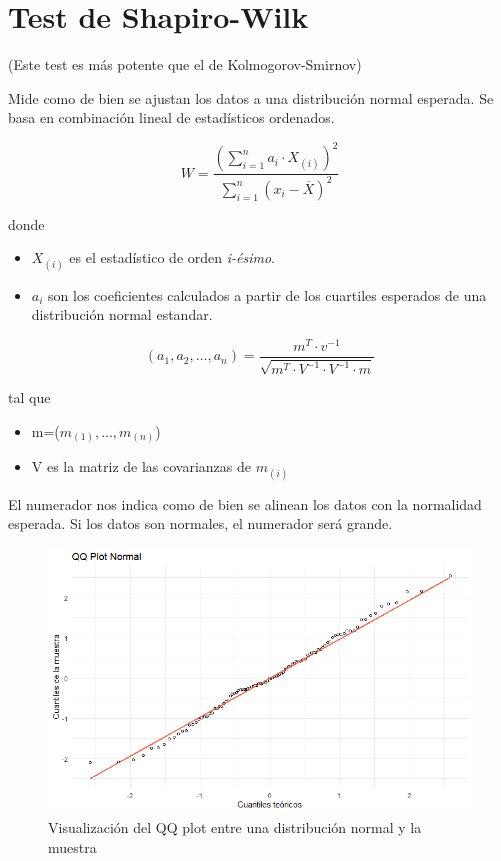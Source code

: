 \section{Test de Shapiro-Wilk}
(Este test es más potente que el de Kolmogorov-Smirnov)

Mide como de bien se ajustan los datos a una distribución normal esperada. Se basa en combinación lineal de estadísticos ordenados. %

\[
    W=\frac{\left(\sum_{i=1}^{n} a_i \cdot X_{(i)}\right)^2}{\sum_{i=1}^{n}(x_i-\overline{X})^2}
\]

\noindent donde

\begin{itemize}
    \item $X_{(i)}$ es el estadístico de orden \textit{i-ésimo}.
    \item $a_i$ son los coeficientes calculados a partir de los cuartiles esperados de una distribución normal estandar. 
\end{itemize}

\[
    (a_1,a_2,\dots,a_n)=\frac{m^T\cdot v^{-1}}{\sqrt{m^T \cdot V^{-1} \cdot V^{-1} \cdot m}}
\]

\noindent tal que

\begin{itemize}
    \item m=($m_{(1)},\dots,m_{(n)}$)
    \item V es la matriz de las covarianzas de $m_{(i)}$
\end{itemize}

El numerador nos indica como de bien se alinean los datos con la normalidad esperada. Si los datos son normales, el numerador será grande.

\begin{figure}[h!]
    \centering
    \includegraphics[width=\textwidth]{assets/QQplot.png}
    \caption{Visualización del QQ plot entre una distribución normal y la muestra}
    \label{fig:qqplot_normal}
\end{figure}